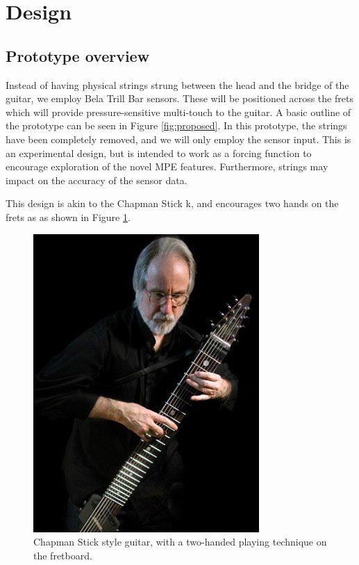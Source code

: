 
\section{Design}
\subsection{Prototype overview}
Instead of having physical strings strung between the head and the bridge of the guitar, we employ Bela Trill Bar sensors. These will be positioned across the frets which will provide pressure-sensitive multi-touch to the guitar. A basic outline of the prototype can be seen in Figure \ref{fig:proposed}. In this prototype, the strings have been completely removed, and we will only employ the sensor input. This is an experimental design, but is intended to work as a forcing function \citep{norman_design_2013} to encourage exploration of the novel MPE features. Furthermore, strings may impact on the accuracy of the sensor data. 

This design is akin to the Chapman Stick k\citep{stick_enterprises_stick_2021}, and encourages two hands on the frets as as shown in Figure \ref{fig:chapman}.

\begin{figure}[h]
    \centering
    \includegraphics[scale=0.9]{Images/chapman.jpg}
    \caption{Chapman Stick style guitar, with a two-handed playing technique on the fretboard.}
    \label{fig:chapman}
\end{figure}

